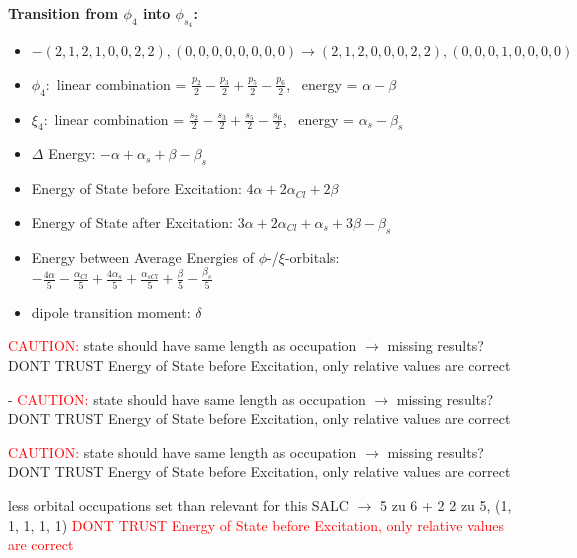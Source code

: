 \documentclass[12pt,a4paper]{article}
\begin{document}
        \noindent\textbf{Transition from $\phi_{4}$ into $\phi_{s_{4}}$:}
        \begin{itemize}
            \item $- (2, 1, 2, 1, 0, 0, 2, 2), (0, 0, 0, 0, 0, 0, 0, 0) \rightarrow (2, 1, 2, 0, 0, 0, 2, 2), (0, 0, 0, 1, 0, 0, 0, 0)$
        
            \item $\phi_{4}:$ linear combination = $\frac{p_{2}}{2} - \frac{p_{3}}{2} + \frac{p_{5}}{2} - \frac{p_{6}}{2}$, \
            energy = $\alpha - \beta$
            
            \item $\xi_{4}:$ linear combination = $\frac{s_{2}}{2} - \frac{s_{3}}{2} + \frac{s_{5}}{2} - \frac{s_{6}}{2}$, \
            energy = $\alpha_{s} - \beta_{s}$
            
            \item $\Delta$ Energy: $- \alpha + \alpha_{s} + \beta - \beta_{s}$
            \item Energy of State before Excitation: $4 \alpha + 2 \alpha_{Cl} + 2 \beta$
            \item Energy of State after Excitation: $3 \alpha + 2 \alpha_{Cl} + \alpha_{s} + 3 \beta - \beta_{s}$
            \item Energy between Average Energies of $\phi$-/$\xi$-orbitals: \
            $- \frac{4 \alpha}{5} - \frac{\alpha_{Cl}}{5} + \frac{4 \alpha_{s}}{5} + \frac{\alpha_{s Cl}}{5} + \frac{\beta}{5} - \frac{\beta_{s}}{5}$
        
            \item dipole transition moment: $\delta$
        
        \end{itemize}
        
	\textcolor{red}{CAUTION:} state should have same length as occupation $\rightarrow$ missing results?
	DONT TRUST \glqq{}Energy of State before Excitation\grqq{}, only relative values are correct

 - 	\textcolor{red}{CAUTION:} state should have same length as occupation $\rightarrow$ missing results?
	DONT TRUST \glqq{}Energy of State before Excitation\grqq{}, only relative values are correct

	\textcolor{red}{CAUTION:} state should have same length as occupation $\rightarrow$ missing results?
	DONT TRUST \glqq{}Energy of State before Excitation\grqq{}, only relative values are correct

less orbital occupations set than relevant for this SALC $\rightarrow$ 
5 zu 6 + 2 
2 zu 5, (1, 1, 1, 1, 1) 
\textcolor{red}{DONT TRUST \glqq{}Energy of State before Excitation\grqq{}, only relative values are correct}
\end{document}
